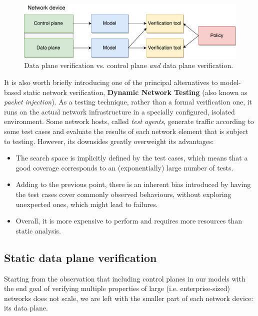 \begin{figure}[h]
  \centering
  \captionsetup{justification=centering}
  \includegraphics[scale=0.5]{src/img/control-data}
  \caption{Data plane verification vs. control plane \emph{and} data plane
  verification.}
  \label{fig:control-data-verif}
\end{figure}

It is also worth briefly introducing one of the principal alternatives to
model-based static network verification, \textbf{Dynamic Network Testing} (also
known as \emph{packet injection}). As a testing technique, rather than a formal
verification one, it runs on the actual network infrastructure in a specially
configured, isolated environment.  Some network hosts, called \emph{test
agents}, generate traffic according to some test cases and evaluate the results
of each network element that is subject to testing.  However, its downsides
greatly overweight its advantages:

\begin{itemize}
  \item The search space is implicitly defined by the test cases, which means
    that a good coverage corresponds to an (exponentially) large number of
    tests.
  \item Adding to the previous point, there is an inherent bias introduced by
    having the test cases cover commonly observed behaviours, without exploring
    unexpected ones, which might lead to failures.
  \item Overall, it is more expensive to perform and requires more resources
    than static analysis.
\end{itemize}


\subsection{Static data plane verification}\label{sub-sec:static-dp-verif}

Starting from the observation that including control planes in our models with
the end goal of verifying multiple properties of large (i.e.  enterprise-sized)
networks does not scale, we are left with the smaller part of each network
device: its data plane.

